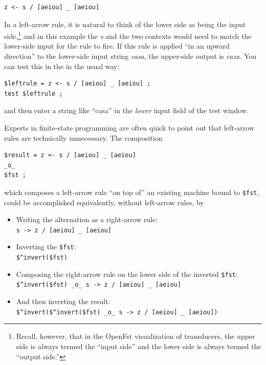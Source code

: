 \begin{Verbatim}
z <- s / [aeiou] _ [aeiou]
\end{Verbatim}

\noindent
In a left-arrow rule, it is natural to think of the lower side as being the input side,\footnote{Recall,
however, that in the OpenFst visualization of transducers, the upper side is always termed the ``input
side'' and the lower side is always termed the ``output side.''} and in this example the
\emph{s} and
the two contexts would need to match the lower-side input for the rule to fire.  If this rule is
applied ``in an upward direction'' to the lower-side input string \emph{casa}, the upper-side output
is \emph{caza}.  You can test this in the  in the usual way:


\begin{Verbatim}
$leftrule = z <- s / [aeiou] _ [aeiou] ;
test $leftrule ;
\end{Verbatim}

\noindent
and then enter a string like ``casa'' in the \emph{lower} input field of the test window.


Experts in finite-state programming are often quick to point out that left-arrow rules
are technically unnecessary.  The composition

\begin{Verbatim}
$result = z <- s / [aeiou] _ [aeiou] 
_o_ 
$fst ;
\end{Verbatim}

\noindent
which composes a left-arrow rule ``on top of'' an existing machine bound to \verb!$fst!,
could be accomplished equivalently, without left-arrow rules, by 

\begin{itemize}
\item
Writing the alternation as a right-arrow rule:\\\verb!s -> z / [aeiou] _ [aeiou]!
\item
Inverting the \verb!$fst!:\\  \verb!$^invert($fst)!
\item
Composing the right-arrow rule on the lower side of the inverted
\verb!$fst!:\\
\verb!$^invert($fst) _o_ s -> z / [aeiou] _ [aeiou]!
\item
And then inverting the result:\\ 
\verb!$^invert($^invert($fst) _o_ s -> z / [aeiou] _ [aeiou])!
\end{itemize}


